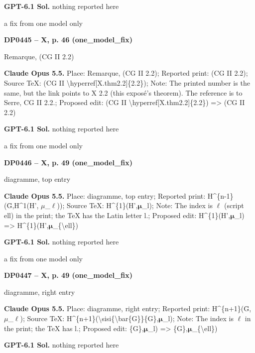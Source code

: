 \textbf{GPT-6.1 Sol.} nothing reported here\par
a fix from one model only\par
\par\noindent\hypertarget{DP0445}{}\textbf{DP0445 -- X, p. 46 (one\_model\_fix)}\par
Remarque, (CG II 2.2)\par
\textbf{Claude Opus 5.5.} Place: Remarque, (CG II 2.2); Reported print: (CG II 2.2); Source TeX: (CG II \textbackslash{}hyperref[X.thm2.2]\{2.2\}); Note: The printed number is the same, but the link points to X 2.2 (this exposé's theorem). The reference is to Serre, CG II 2.2.; Proposed edit: (CG II \textbackslash{}hyperref[X.thm2.2]\{2.2\}) =\allowbreak > (CG II 2.2)\par
\textbf{GPT-6.1 Sol.} nothing reported here\par
a fix from one model only\par
\par\noindent\hypertarget{DP0446}{}\textbf{DP0446 -- X, p. 49 (one\_model\_fix)}\par
diagramme, top entry\par
\textbf{Claude Opus 5.5.} Place: diagramme, top entry; Reported print: H\textasciicircum{}\{n-1\}(Ḡ,H\textasciicircum{}1(H', \ensuremath{\mu}\_\ensuremath{\ell})); Source TeX: H\textasciicircum{}\{1\}(H',\ensuremath{𝛍}\_l); Note: The index is \ensuremath{\ell} (script ell) in the print; the TeX has the Latin letter l.; Proposed edit: H\textasciicircum{}\{1\}(H',\ensuremath{𝛍}\_l) =\allowbreak > H\textasciicircum{}\{1\}(H',\ensuremath{𝛍}\_\{\textbackslash{}ell\})\par
\textbf{GPT-6.1 Sol.} nothing reported here\par
a fix from one model only\par
\par\noindent\hypertarget{DP0447}{}\textbf{DP0447 -- X, p. 49 (one\_model\_fix)}\par
diagramme, right entry\par
\textbf{Claude Opus 5.5.} Place: diagramme, right entry; Reported print: H\textasciicircum{}\{n+1\}(Ḡ, \ensuremath{\mu}\_\ensuremath{\ell}); Source TeX: H\textasciicircum{}\{n+1\}(\textbackslash{}sisi\{\textbackslash{}bar\{G\}\}\{G\},\ensuremath{𝛍}\_l); Note: The index is \ensuremath{\ell} in the print; the TeX has l.; Proposed edit: \{G\},\ensuremath{𝛍}\_l) =\allowbreak > \{G\},\ensuremath{𝛍}\_\{\textbackslash{}ell\})\par
\textbf{GPT-6.1 Sol.} nothing reported here\par
